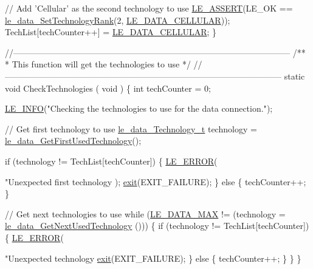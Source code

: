 \begin{DoxyCodeInclude}
{    \textcolor{comment}{// Add 'Cellular' as the second technology to use}
    \hyperlink{le__log_8h_ac0dbbef91dc0fed449d0092ff0557b39}{LE\_ASSERT}(LE\_OK == \hyperlink{le__data__interface_8h_aeb5f71861d30b8442b2c11ca34bc73c4}{le\_data\_SetTechnologyRank}(2, 
      \hyperlink{le__data__interface_8h_a245d12b4d3367d81c0fc8b76fa60674aaaa3c712c673bf5a353beba020c415a5f}{LE\_DATA\_CELLULAR}));
    TechList[techCounter++] = \hyperlink{le__data__interface_8h_a245d12b4d3367d81c0fc8b76fa60674aaaa3c712c673bf5a353beba020c415a5f}{LE\_DATA\_CELLULAR};
\}

\textcolor{comment}{//--------------------------------------------------------------------------------------------------}\textcolor{comment}{}
\textcolor{comment}{/**}
\textcolor{comment}{ *  This function will get the technologies to use}
\textcolor{comment}{ */}
\textcolor{comment}{//--------------------------------------------------------------------------------------------------}
\textcolor{keyword}{static} \textcolor{keywordtype}{void} CheckTechnologies
(
    \textcolor{keywordtype}{void}
)
\{
    \textcolor{keywordtype}{int} techCounter = 0;

    \hyperlink{le__log_8h_a23e6d206faa64f612045d688cdde5808}{LE\_INFO}(\textcolor{stringliteral}{"Checking the technologies to use for the data connection."});

    \textcolor{comment}{// Get first technology to use}
    \hyperlink{le__data__interface_8h_a245d12b4d3367d81c0fc8b76fa60674a}{le\_data\_Technology\_t} technology = 
      \hyperlink{le__data__interface_8h_affc9e22694ddee1141983129f6e29837}{le\_data\_GetFirstUsedTechnology}();

    \textcolor{keywordflow}{if} (technology != TechList[techCounter])
    \{
        \hyperlink{le__log_8h_a353590f91b3143a7ba3a416ae5a50c3d}{LE\_ERROR}(\textcolor{stringliteral}{"Unexpected first technology %
      );
        \hyperlink{app_stop_client_8c_a310220604a584e112ba8f7aa3dfe23f1}{exit}(EXIT\_FAILURE);
    \}
    \textcolor{keywordflow}{else}
    \{
        techCounter++;
    \}

    \textcolor{comment}{// Get next technologies to use}
    \textcolor{keywordflow}{while} (\hyperlink{le__data__interface_8h_a245d12b4d3367d81c0fc8b76fa60674aa5143acc7e16842ac4cf33afa34b50c0b}{LE\_DATA\_MAX} != (technology = \hyperlink{le__data__interface_8h_af262685afd895d084e9ee485de514264}{le\_data\_GetNextUsedTechnology}
      ()))
    \{
        \textcolor{keywordflow}{if} (technology != TechList[techCounter])
        \{
            \hyperlink{le__log_8h_a353590f91b3143a7ba3a416ae5a50c3d}{LE\_ERROR}(\textcolor{stringliteral}{"Unexpected technology %
            \hyperlink{app_stop_client_8c_a310220604a584e112ba8f7aa3dfe23f1}{exit}(EXIT\_FAILURE);
        \}
        \textcolor{keywordflow}{else}
        \{
            techCounter++;
        \}
    \}
\}

}}}
\end{DoxyCodeInclude}
